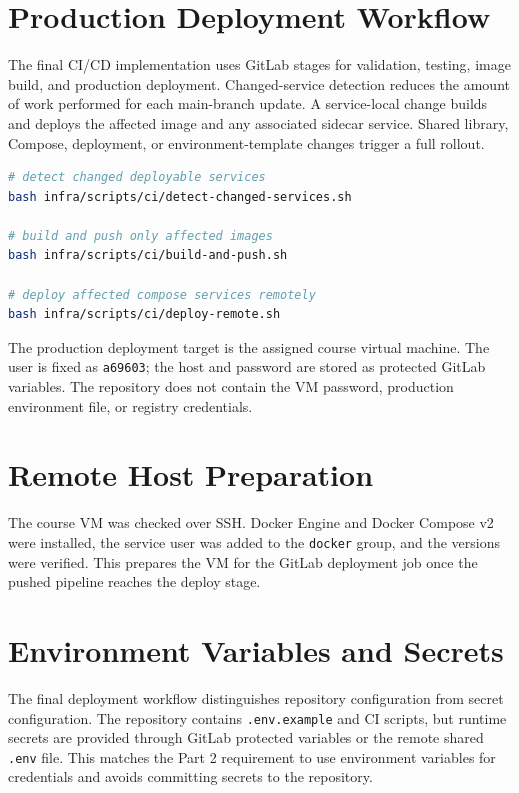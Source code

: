 \documentclass[12pt,a4paper]{report}
\begin{document}
\section{Production Deployment Workflow}
\label{sec:production-deploy}

The final CI/CD implementation uses GitLab stages for validation, testing,
image build, and production deployment. Changed-service detection reduces the
amount of work performed for each main-branch update. A service-local change
builds and deploys the affected image and any associated sidecar service. Shared
library, Compose, deployment, or environment-template changes trigger a full
rollout.

\begin{lstlisting}[language=bash,caption={Changed-service deployment shape}]
# detect changed deployable services
bash infra/scripts/ci/detect-changed-services.sh

# build and push only affected images
bash infra/scripts/ci/build-and-push.sh

# deploy affected compose services remotely
bash infra/scripts/ci/deploy-remote.sh
\end{lstlisting}

The production deployment target is the assigned course virtual machine. The
user is fixed as \texttt{a69603}; the host and password are stored as protected
GitLab variables. The repository does not contain the VM password, production
environment file, or registry credentials.

\section{Remote Host Preparation}
\label{sec:remote-host}

The course VM was checked over SSH. Docker Engine and Docker Compose v2 were
installed, the service user was added to the \texttt{docker} group, and the
versions were verified. This prepares the VM for the GitLab deployment job once
the pushed pipeline reaches the deploy stage.

\section{Environment Variables and Secrets}
\label{sec:secrets}

The final deployment workflow distinguishes repository configuration from
secret configuration. The repository contains \texttt{.env.example} and CI
scripts, but runtime secrets are provided through GitLab protected variables or
the remote shared \texttt{.env} file. This matches the Part 2 requirement to use
environment variables for credentials and avoids committing secrets to the
repository.
\end{document}
